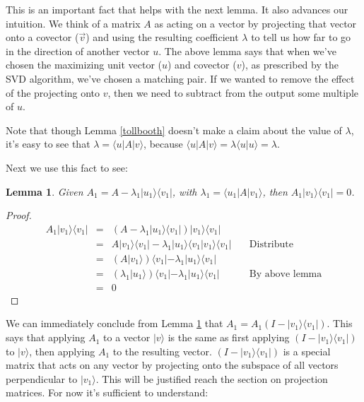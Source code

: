 \documentclass{amsbook}
\newtheorem{lemma}[theorem]{Lemma}
\begin{document}
This is an important fact that helps with the next lemma.  It also advances our intuition.  We think of a matrix $A$ as acting on a vector by projecting that vector onto a covector ($\vec v$) and using the resulting coefficient $\lambda$ to tell us how far to go in the direction of another vector $u$.  The above lemma says that when we've chosen the maximizing unit vector ($ u $) and covector ($ v $), as prescribed by the SVD algorithm, we've chosen a matching pair.  If we wanted to remove the effect of the projecting onto $ v $, then we need to subtract from the output some multiple of $ u $.

Note that though Lemma \ref{tollbooth} doesn't make a claim about the value of $\lambda$, it's easy to see that $\lambda=\langle u |A| v\rangle$, because $\langle u|A|v\rangle = \lambda\langle u|u\rangle = \lambda$.

Next we use this fact to see:

\begin{lemma}
\label{a1lemma}
Given $A_1=A-\lambda_1| u _1\rangle\langle v _1|$, with $\lambda_1=\langle u_1|A|v_1\rangle$, then $A_1| v _1\rangle\langle v _1|=0$.
\end{lemma}

\begin{proof}
$$
\begin{array}{rcll}
A_1| v _1\rangle\langle v _1| &=& \left(A-\lambda_1| u _1\rangle\langle v _1|\right)| v _1\rangle\langle v _1|& \\
&=& A| v _1\rangle\langle v _1| - \lambda_1| u _1\rangle\langle v _1| v _1\rangle\langle v _1| & \quad\text{Distribute}\\
&=& \left(A| v _1\rangle\right)\langle v _1| - \lambda_1| u _1\rangle\langle v _1|& \\
&=& \left(\lambda_1| u _1\rangle\right)\langle v _1| - \lambda_1| u _1\rangle\langle v _1|&\quad\text{By above lemma} \\
&=& 0
\end{array}
$$
\end{proof}

We can immediately conclude from Lemma \ref{a1lemma} that $A_1=A_1\left(I-| v _1\rangle\langle v _1|\right)$.  This says that applying $A_1$ to a vector $| v \rangle$ is the same as first applying $\left(I-| v _1\rangle\langle v _1|\right)$ to $| v \rangle$, then applying $A_1$ to the resulting vector.  $\left(I-| v _1\rangle\langle v _1|\right)$ is a special matrix that acts on any vector by projecting onto the subspace of all vectors perpendicular to $| v _1\rangle$.  This will be justified reach the section on projection matrices.  For now it's sufficient to understand:
\end{document}
